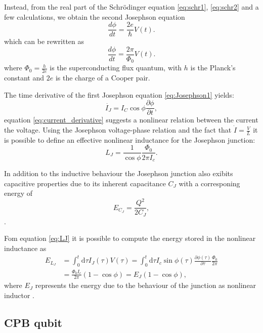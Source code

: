 Instead, from the real part of the Schr\"odinger equation \ref{eq:schr1}, \ref{eq:schr2} and a few calculations, we obtain the second Josephson equation
\begin{equation}\label{eq:Josephson2}
    \frac{d\phi}{dt} = \frac{2e}{\hbar} V(t).
\end{equation}
which can be rewritten as \begin{equation}
    \frac{d\phi}{dt} = \frac{2\pi}{\Phi_0} V(t).
\end{equation}
where $\Phi_0 = \frac{h}{2e}$ is the superconducting flux quantum, with $h$ is the Planck's constant and $2e$ is the charge of a Cooper pair.

The time derivative of the first Josephson equation \ref{eq:Josephson1} yields:
\begin{equation}\label{eq:current_derivative}
    \dot{I_J}=I_C\cos{\phi}\frac{\partial \phi}{\partial t},
\end{equation}
equation \ref{eq:current_derivative} suggests a nonlinear relation between the current the voltage. 
Using the Josephson voltage-phase relation and the fact that $\dot{I}=\frac{V}{L}$ it is possible to define an effective nonlinear inductance for the Josephson junction:
\begin{equation}\label{eq:LJ}
    L_J = \frac{1}{\cos{\phi}}\frac{\Phi_0}{2\pi I_c}.
\end{equation} 

In addition to ths inductive behaviour the Josephson junction also exibits capacitive properties due to its inherent capacitance $C_J$ with a corresponing energy of 
\begin{equation}\label{eq:capacitive_energy}
    E_{C_J} = \frac{Q^2}{2C_J},
\end{equation}.

Fom equation \ref{eq:LJ} it is possible to compute the energy stored in the nonlinear inductance as
\begin{align}\label{eq:inductive_energy}
    E_{L_J} &= \int_{0}^{t}\text{d}\tau I_J(\tau)V(\tau) = \int_{0}^{t}\text{d}\tau I_c\sin{\phi(\tau)}\frac{\partial\phi(\tau)}{\partial\tau}\frac{\Phi_0}{2\pi}\\
    &= \frac{\Phi_0 I_c}{2\pi}(1-\cos{\phi}) = E_J(1-\cos{\phi}),
\end{align}
where $E_J$ represents the energy due to the behaviour of the junction as nonlinear inductor .

\subsection{CPB qubit}

